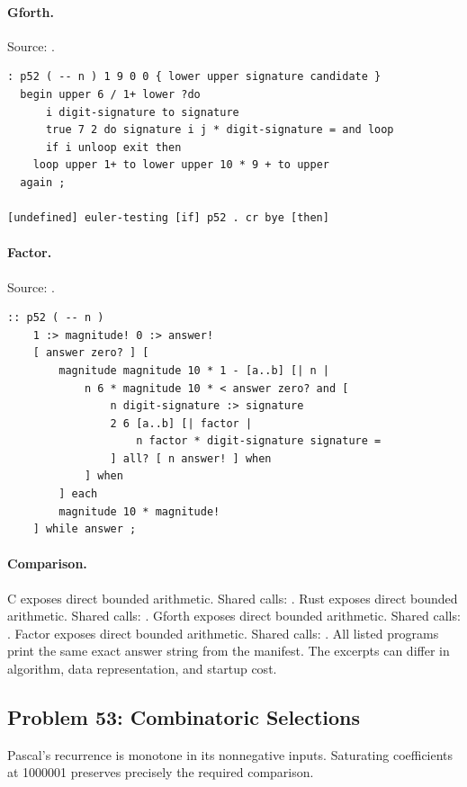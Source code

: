 \paragraph{Gforth.} Source: .
\begin{lstlisting}
: p52 ( -- n ) 1 9 0 0 { lower upper signature candidate }
  begin upper 6 / 1+ lower ?do
      i digit-signature to signature
      true 7 2 do signature i j * digit-signature = and loop
      if i unloop exit then
    loop upper 1+ to lower upper 10 * 9 + to upper
  again ;

[undefined] euler-testing [if] p52 . cr bye [then]
\end{lstlisting}

\paragraph{Factor.} Source: .
\begin{lstlisting}
:: p52 ( -- n )
    1 :> magnitude! 0 :> answer!
    [ answer zero? ] [
        magnitude magnitude 10 * 1 - [a..b] [| n |
            n 6 * magnitude 10 * < answer zero? and [
                n digit-signature :> signature
                2 6 [a..b] [| factor |
                    n factor * digit-signature signature =
                ] all? [ n answer! ] when
            ] when
        ] each
        magnitude 10 * magnitude!
    ] while answer ;
\end{lstlisting}

\paragraph{Comparison.}
C exposes direct bounded arithmetic. Shared calls: \texttt{}. Rust exposes direct bounded arithmetic. Shared calls: \texttt{}. Gforth exposes direct bounded arithmetic. Shared calls: \texttt{}. Factor exposes direct bounded arithmetic. Shared calls: \texttt{}.
All listed programs print the same exact answer string from the manifest. The excerpts can differ in algorithm, data representation, and startup cost.

\subsection{Problem 53: Combinatoric Selections}
\label{walkthrough:p53}
Pascal's recurrence is monotone in its nonnegative inputs. Saturating coefficients at 1000001 preserves precisely the required comparison.

